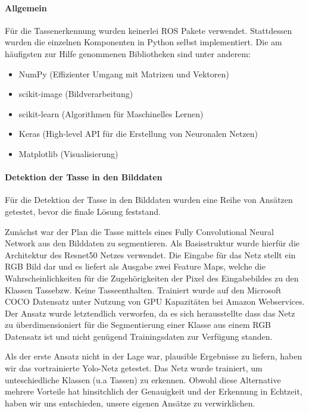 \paragraph{Allgemein}
Für die Tassenerkennung wurden keinerlei ROS Pakete verwendet. Stattdessen wurden die einzelnen Komponenten in Python selbst implementiert. Die am häufigsten zur Hilfe genommenen Bibliotheken sind unter anderem:
\begin{itemize}
\item NumPy (Effizienter Umgang mit Matrizen und Vektoren)
\item scikit-image (Bildverarbeitung)
\item scikit-learn (Algorithmen für Maschinelles Lernen)
\item Keras (High-level API für die Erstellung von Neuronalen Netzen)
\item Matplotlib (Visualisierung)
\end{itemize}

\paragraph{Detektion der Tasse in den Bilddaten}
Für die Detektion der Tasse in den Bilddaten wurden eine Reihe von Ansätzen getestet, bevor die finale Lösung feststand.

Zunächst war der Plan die Tasse mittels eines Fully Convolutional Neural Network aus den Bilddaten zu segmentieren. Als Basisstruktur wurde hierfür die Architektur des Resnet50 Netzes verwendet. Die Eingabe für das Netz stellt ein RGB Bild dar und es liefert als Ausgabe zwei Feature Maps, welche die Wahrscheinlichkeiten für die Zugehörigkeiten der Pixel des Eingabebildes zu den Klassen \glqq Tasse\grqq bzw. \glqq Keine Tasse\grqq enthalten. Trainiert wurde auf den Microsoft COCO Datensatz unter Nutzung von GPU Kapazitäten bei Amazon Webservices. Der Ansatz wurde letztendlich verworfen, da es sich herausstellte dass das Netz zu überdimensioniert für die Segmentierung einer Klasse aus einem RGB Datensatz ist und nicht genügend Trainingsdaten zur Verfügung standen.

Als der erste Ansatz nicht in der Lage war, plausible Ergebnisse zu liefern, haben wir das vortrainierte Yolo-Netz getestet. Das Netz wurde trainiert, um unteschiedliche Klassen (u.a Tassen) zu erkennen. Obwohl diese Alternative mehrere Vorteile hat hinsitchlich der Genauigkeit und der Erkennung in Echtzeit, haben wir uns entschieden, unsere eigenen Ansätze zu verwirklichen.


